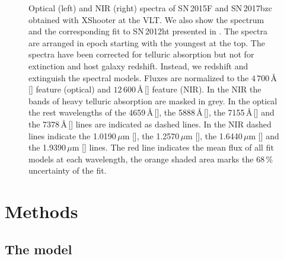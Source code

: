 \documentclass[fleqn,usenatbib]{mnras}
\begin{document}
\begin{figure}
    \caption{Optical (left) and NIR (right) spectra of SN\,2015F and SN\,2017bzc obtained with XShooter at the VLT. We also show the spectrum and the corresponding fit to SN\,2012ht presented in \citep{2018MNRAS.477.3567M}. The spectra are arranged in epoch starting with the youngest at the top. The spectra have been corrected for telluric absorption but not for extinction and host galaxy redshift. Instead, we redshift and extinguish the spectral models. Fluxes are normalized to the $4\,700\,$\AA\,[] feature (optical) and $12\,600\,$\AA\,[] feature (NIR). In the NIR the bands of heavy telluric absorption are masked in grey. In the optical the rest wavelengths of the 4659\,\AA\,[], the 5888\,\AA\,[], the 7155\,\AA\,[] and the 7378\,\AA\,[] lines are indicated as dashed lines. In the NIR dashed lines indicate the 1.0190\,$\mu$m [], the 1.2570\,$\mu$m [], the 1.6440\,$\mu$m [] and the 1.9390\,$\mu$m [] lines. The red line indicates the mean flux of all fit models at each wavelength, the orange shaded area marks the $68\,\%$ uncertainty of the fit. }
    \label{OpticalSpectra}
\end{figure}
\section{Methods}
\label{SectionModels}



\subsection{The model}
\label{SectionTheModel}
\end{document}
